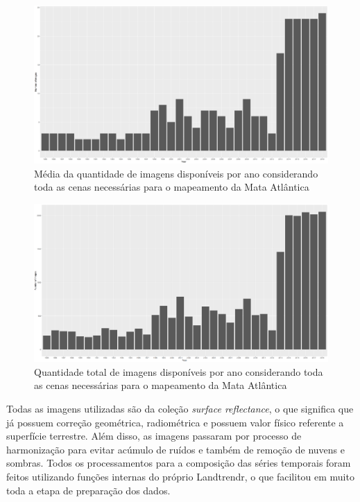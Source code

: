 \begin{landscape}
\begin{figure}[!h]
   \centering
    \includegraphics[height=0.85\textheight]{images/landsat_count_per_year_mean.pdf}
    \caption{Média da quantidade de imagens disponíveis por ano considerando toda as cenas necessárias para o mapeamento da Mata Atlântica}
    \label{fig:landsat_count_per_year_mean}
\end{figure}
\end{landscape}

\begin{landscape}
\begin{figure}[!h]
   \centering
    \includegraphics[height=0.85\textheight]{images/landsat_count_per_year.pdf}
    \caption{Quantidade total de imagens disponíveis por ano considerando toda as cenas necessárias para o mapeamento da Mata Atlântica}
    \label{fig:landsat_count_per_year}
\end{figure}
\end{landscape}

Todas as imagens utilizadas são da coleção \emph{surface reflectance}, o que significa que já possuem correção geométrica, radiométrica e possuem valor físico referente a superfície terrestre. Além disso, as imagens passaram por processo de harmonização para evitar acúmulo de ruídos e também de remoção de nuvens e sombras. Todos os processamentos para a composição das séries temporais foram feitos utilizando funções internas do próprio Landtrendr, o que facilitou em muito toda a etapa de preparação dos dados.

